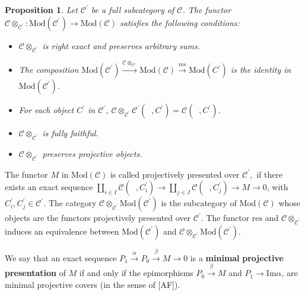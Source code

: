 \documentclass{amsart}
\theoremstyle{plain}
\newtheorem{proposition}{Proposition}
\numberwithin{equation}{section}
\begin{document}
\begin{proposition}
\label{cap1.9} Let $\mathcal{C}^{\prime }$ be a full subcategory of $\mathcal{C}$. The functor $\mathcal{C}\otimes _{\mathcal{C}^{\prime }}:\mathrm{Mod}(\mathcal{C}^{\prime })\rightarrow \mathrm{Mod}(\mathcal{C})$
satisfies the following conditions:

\begin{itemize}
\item[(a)] $\mathcal{C}\otimes _{\mathcal{C}^{\prime }}$ is right exact and
preserves arbitrary sums.

\item[(b)] The composition $\mathrm{Mod}(\mathcal{C}^{\prime })\xrightarrow{\mathcal
C\otimes_{\mathcal C'}}\mathrm{Mod}(\mathcal{C})\xrightarrow{\mathrm{res}}\mathrm{Mod}(C^{\prime })$ is the identity in $\mathrm{Mod}(\mathcal{C}^{\prime }).$

\item[(c)] For each object $C^{\prime }$ in $\mathcal{C}^{\prime }$, $\mathcal{C}\otimes _{\mathcal{C}^{\prime }}\mathcal{C}^{\prime
}(\;\;,C^{\prime })=\mathcal{C}(\;\;,C^{\prime })$.

\item[(d)] $\mathcal{C}\otimes _{\mathcal{C}^{\prime }}$ is fully faithful.

\item[(e)] $\mathcal{C}\otimes _{\mathcal{C}^{\prime }}$ preserves
projective objects.
\end{itemize}
\end{proposition}

The functor $M$ in $\mathrm{Mod}(\mathcal{C})$ is called projectively
presented over $\mathcal{C}^{\prime },$ if there exists an exact sequence $\coprod_{i\in I}\mathcal{C}(\;\;,C_{i}^{\prime })\rightarrow \coprod_{j\in J}\mathcal{C}(\;\;,C_{j}^{\prime })\rightarrow M\rightarrow 0$, with $C_{i}^{\prime },C_{j}^{\prime }\in \mathcal{C}^{\prime }$. The category $\mathcal{C}\otimes _{\mathcal{C}^{\prime }}\mathrm{Mod}(\mathcal{C}^{\prime
})$ is the subcategory of $\mathrm{Mod}(\mathcal{C})$ whose objects are the
functors projectively presented over $\mathcal{C}^{\prime }$. The functor $\mathrm{res}$ and $\mathcal{C}\otimes _{\mathcal{C}^{\prime }}$ induces an
equivalence between $\mathrm{Mod}(\mathcal{C}^{\prime })$ and $\mathcal{C}\otimes _{\mathcal{C}^{\prime }}\mathrm{Mod}(\mathcal{C}^{\prime })$.

We say that an exact sequence $P_{1}\xrightarrow{\alpha}P_{0}\xrightarrow{\beta}M\rightarrow 0$ is a \textbf{minimal} \textbf{projective
presentation} of $M$ if and only if the epimorphisms $P_{0}\xrightarrow{\beta} M$ and $P_{1}\rightarrow \mathrm{Im}\alpha$, are minimal
projective covers (in the sense of [AF]).
\end{document}
